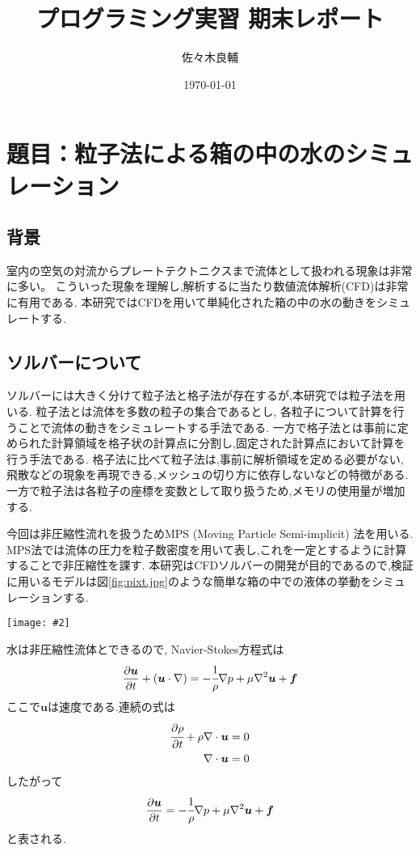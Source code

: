 \documentclass[uplatex,a4j,11pt]{jsarticle}
\makeatletter
\def\fgcaption{\def\@captype{figure}\caption}
\newcommand{\mfig}[3][width=15cm]{
\begin{center}
    \texttt{[image: \#2]}
\fgcaption{#3 \label{fig:#2}}
\end{center}
}
\makeatother
\begin{document}
\title{プログラミング実習 期末レポート}
\author{佐々木良輔}
\date{\today}
\maketitle

\section*{題目：粒子法による箱の中の水のシミュレーション}
\subsection{背景}
室内の空気の対流からプレートテクトニクスまで流体として扱われる現象は非常に多い。
こういった現象を理解し,解析するに当たり数値流体解析(CFD)は非常に有用である.
本研究ではCFDを用いて単純化された箱の中の水の動きをシミュレートする.
\subsection{ソルバーについて}
ソルバーには大きく分けて粒子法と格子法が存在するが,本研究では粒子法を用いる.
粒子法とは流体を多数の粒子の集合であるとし,
各粒子について計算を行うことで流体の動きをシミュレートする手法である.
一方で格子法とは事前に定められた計算領域を格子状の計算点に分割し,固定された計算点において計算を行う手法である.
格子法に比べて粒子法は,事前に解析領域を定める必要がない,飛散などの現象を再現できる,メッシュの切り方に依存しないなどの特徴がある.
一方で粒子法は各粒子の座標を変数として取り扱うため,メモリの使用量が増加する.

今回は非圧縮性流れを扱うためMPS (Moving Particle Semi-implicit) 法を用いる.\cite{ryuusi}\cite{ELEM13}
MPS法では流体の圧力を粒子数密度を用いて表し,これを一定とするように計算することで非圧縮性を課す.
本研究はCFDソルバーの開発が目的であるので,検証に用いるモデルは図\ref{fig:pixt.jpg}のような簡単な箱の中での液体の挙動をシミュレーションする.
\mfig[width=10cm]{init.eps}{検証モデル(青点:流体粒子,灰点:ダミー粒子,黒点:壁粒子)\cite{ELEM13}}
水は非圧縮性流体とできるので, Navier-Stokes方程式は
\begin{align}
    \label{NSequ}
    \frac{\partial\bm{u}}{\partial t}+(\bm{u}\cdot\nabla)=-\cfrac{1}{\rho}\nabla p+\mu\nabla^2\bm{u}+\bm{f}
\end{align}
ここで$\bm{u}$は速度である.連続の式は
\begin{align}
    \label{cont1}
    \cfrac{\partial\rho}{\partial t}+\rho\nabla\cdot\bm{u}=0\\
    \label{cont2}
    \nabla\cdot\bm{u}=0
\end{align}
したがって
\begin{align}
    \label{NSequ2}
    \frac{\partial\bm{u}}{\partial t}=-\cfrac{1}{\rho}\nabla p+\mu\nabla^2\bm{u}+\bm{f}
\end{align}
と表される.
\end{document}
